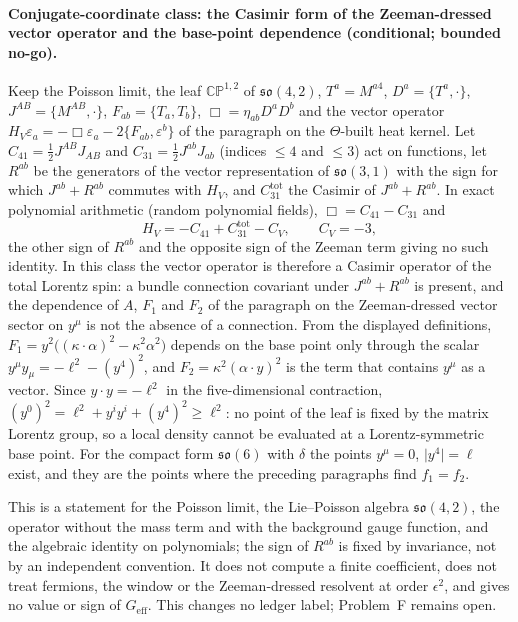\paragraph{Conjugate-coordinate class: the Casimir form of the Zeeman-dressed vector operator and the base-point dependence (conditional; bounded no-go).}
Keep the Poisson limit, the leaf \(\mathbb{CP}^{1,2}\) of \(\mathfrak{so}(4,2)\), \(T^a=M^{a4}\), \(D^a=\{T^a,\cdot\}\), \(J^{AB}=\{M^{AB},\cdot\}\), \(F_{ab}=\{T_a,T_b\}\), \(\Box=\eta_{ab}D^aD^b\) and the vector operator \(H_V\varepsilon_a=-\Box\varepsilon_a-2\{F_{ab},\varepsilon^b\}\) of the paragraph on the \(\Theta\)-built heat kernel. Let \(C_{41}=\tfrac12J^{AB}J_{AB}\) and \(C_{31}=\tfrac12J^{ab}J_{ab}\) (indices \(\le4\) and \(\le3\)) act on functions, let \(R^{ab}\) be the generators of the vector representation of \(\mathfrak{so}(3,1)\) with the sign for which \(J^{ab}+R^{ab}\) commutes with \(H_V\), and \(C_{31}^{\mathrm{tot}}\) the Casimir of \(J^{ab}+R^{ab}\). In exact polynomial arithmetic (random polynomial fields), \(\Box=C_{41}-C_{31}\) and
\[
  H_V=-C_{41}+C_{31}^{\mathrm{tot}}-C_V,\qquad C_V=-3 ,
\]
the other sign of \(R^{ab}\) and the opposite sign of the Zeeman term giving no such identity. In this class the vector operator is therefore a Casimir operator of the total Lorentz spin: a bundle connection covariant under \(J^{ab}+R^{ab}\) is present, and the dependence of \(A\), \(F_1\) and \(F_2\) of the paragraph on the Zeeman-dressed vector sector on \(y^\mu\) is not the absence of a connection. From the displayed definitions, \(F_1=y^2\bigl((\kappa\cdot\alpha)^2-\kappa^2\alpha^2\bigr)\) depends on the base point only through the scalar \(y^\mu y_\mu=-\ell^2-(y^4)^2\), and \(F_2=\kappa^2(\alpha\cdot y)^2\) is the term that contains \(y^\mu\) as a vector. Since \(y\cdot y=-\ell^2\) in the five-dimensional contraction, \((y^0)^2=\ell^2+y^iy^i+(y^4)^2\ge\ell^2\): no point of the leaf is fixed by the matrix Lorentz group, so a local density cannot be evaluated at a Lorentz-symmetric base point. For the compact form \(\mathfrak{so}(6)\) with \(\delta\) the points \(y^\mu=0\), \(\lvert y^4\rvert=\ell\) exist, and they are the points where the preceding paragraphs find \(f_1=f_2\).

This is a statement for the Poisson limit, the Lie--Poisson algebra \(\mathfrak{so}(4,2)\), the operator without the mass term and with the background gauge function, and the algebraic identity on polynomials; the sign of \(R^{ab}\) is fixed by invariance, not by an independent convention. It does not compute a finite coefficient, does not treat fermions, the window or the Zeeman-dressed resolvent at order \(\epsilon^2\), and gives no value or sign of \(G_{\mathrm{eff}}\). This changes no ledger label; Problem~F remains open.
